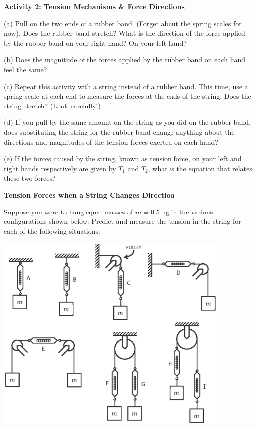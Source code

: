 \textbf{Activity 2: Tension Mechanisms \& Force Directions }

(a) Pull on the two ends of a rubber band. (Forget about the spring scales for
now). Does the rubber band stretch? What is the direction of the force applied
by the rubber band on your right hand? On your left hand?
\answerspace{20mm}

(b) Does the magnitude of the forces applied by the rubber band on each hand
feel the same?
\answerspace{20mm}

(c) Repeat this activity with a string instead of a rubber band. This time,
use a spring scale at each end to measure the forces at the ends of the string.
Does the string stretch? (Look carefully!)
\answerspace{20mm}

(d) If you pull by the same amount on the string as you did on the rubber band,
does substituting the string for the rubber band change anything about the directions
and magnitudes of the tension forces exerted on each hand? 
\answerspace{10mm}

(e) If the forces caused by the string, known as tension force, on your left and right hands respectively
are given by $T_{1}$ and $T_{2}$, what is the equation that relates
these two forces?
\answerspace{20mm}

\pagebreak[3]
\textbf{Tension Forces when a String Changes Direction }

Suppose you were to hang equal masses of $m = 0.5$
kg in the various configurations
shown below. Predict and measure the tension in the string for each of the following
situations.

{\par\centering \includegraphics[width=0.85\textwidth]{newton/newton_fig5_new.eps} \par}


